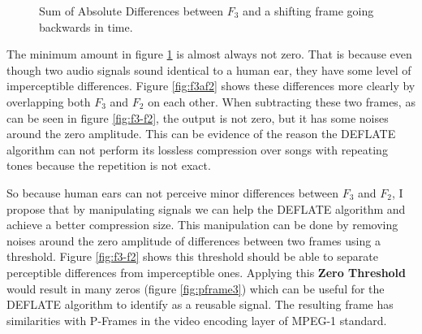 \begin{figure}[ht] 
    \centering
    
    \caption{Sum of Absolute Differences between $F_3$ and a shifting frame going backwards in time.}
    \label{fig:shifting}
\end{figure}

The minimum amount in figure \ref{fig:shifting} is almost always not zero. That is because even though two audio signals sound identical to a human ear, they have some level of imperceptible differences. Figure \ref{fig:f3af2} shows these differences more clearly by overlapping both $F_3$ and $F_2$ on each other. When subtracting these two frames, as can be seen in figure \ref{fig:f3-f2}, the output is not zero, but it has some noises around the zero amplitude. This can be evidence of the reason the DEFLATE algorithm can not perform its lossless compression over songs with repeating tones because the repetition is not exact.

So because human ears can not perceive minor differences between $F_3$ and $F_2$, I propose that by manipulating signals we can help the DEFLATE algorithm and achieve a better compression size. This manipulation can be done by removing noises around the zero amplitude of differences between two frames using a threshold. Figure \ref{fig:f3-f2} shows this threshold should be able to separate perceptible differences from imperceptible ones. Applying this \textbf{Zero Threshold} would result in many zeros (figure \ref{fig:pframe3}) which can be useful for the DEFLATE algorithm to identify as a reusable signal. The resulting frame has similarities with P-Frames in the video encoding layer of MPEG-1 standard\cite{mpeg1-1993-video}.

